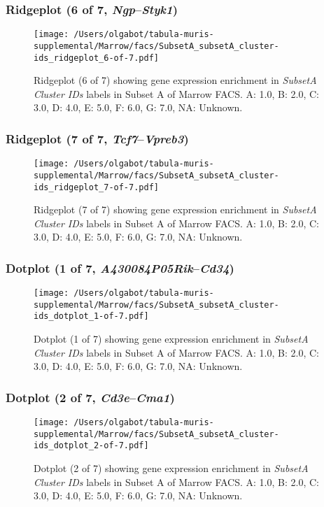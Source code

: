 \clearpage

\subsubsection{Ridgeplot (6 of 7, \emph{Ngp}--\emph{Styk1})}
\begin{figure}[h]
\centering
\texttt{[image: /Users/olgabot/tabula-muris-supplemental/Marrow/facs/SubsetA\_subsetA\_cluster-ids\_ridgeplot\_6-of-7.pdf]}

\caption{ Ridgeplot (6 of 7)  showing gene expression enrichment in \emph{SubsetA Cluster IDs} labels in Subset A of Marrow FACS. A: 1.0, B: 2.0, C: 3.0, D: 4.0, E: 5.0, F: 6.0, G: 7.0, NA: Unknown.}
\end{figure}


\clearpage

\subsubsection{Ridgeplot (7 of 7, \emph{Tcf7}--\emph{Vpreb3})}
\begin{figure}[h]
\centering
\texttt{[image: /Users/olgabot/tabula-muris-supplemental/Marrow/facs/SubsetA\_subsetA\_cluster-ids\_ridgeplot\_7-of-7.pdf]}

\caption{ Ridgeplot (7 of 7)  showing gene expression enrichment in \emph{SubsetA Cluster IDs} labels in Subset A of Marrow FACS. A: 1.0, B: 2.0, C: 3.0, D: 4.0, E: 5.0, F: 6.0, G: 7.0, NA: Unknown.}
\end{figure}


\clearpage

\subsubsection{Dotplot (1 of 7, \emph{A430084P05Rik}--\emph{Cd34})}
\begin{figure}[h]
\centering
\texttt{[image: /Users/olgabot/tabula-muris-supplemental/Marrow/facs/SubsetA\_subsetA\_cluster-ids\_dotplot\_1-of-7.pdf]}

\caption{ Dotplot (1 of 7)  showing gene expression enrichment in \emph{SubsetA Cluster IDs} labels in Subset A of Marrow FACS. A: 1.0, B: 2.0, C: 3.0, D: 4.0, E: 5.0, F: 6.0, G: 7.0, NA: Unknown.}
\end{figure}


\clearpage

\subsubsection{Dotplot (2 of 7, \emph{Cd3e}--\emph{Cma1})}
\begin{figure}[h]
\centering
\texttt{[image: /Users/olgabot/tabula-muris-supplemental/Marrow/facs/SubsetA\_subsetA\_cluster-ids\_dotplot\_2-of-7.pdf]}

\caption{ Dotplot (2 of 7)  showing gene expression enrichment in \emph{SubsetA Cluster IDs} labels in Subset A of Marrow FACS. A: 1.0, B: 2.0, C: 3.0, D: 4.0, E: 5.0, F: 6.0, G: 7.0, NA: Unknown.}
\end{figure}


